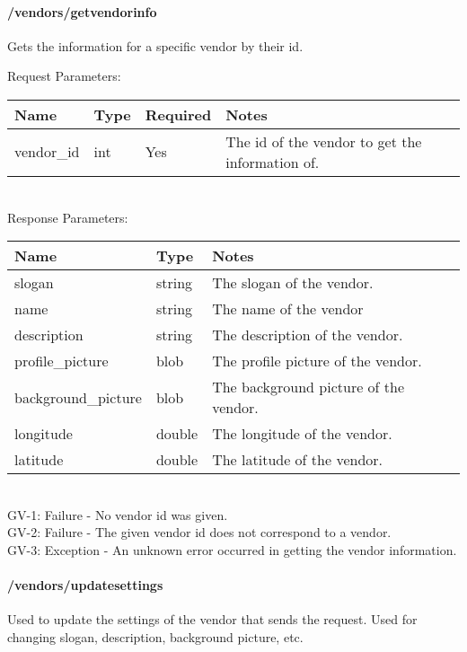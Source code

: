\documentclass{article}[11pt]
\begin{document}
\paragraph{/vendors/getvendorinfo}\textbf{}

Gets the information for a specific vendor by their id.

\noindent
Request Parameters:

\noindent
\begin{tabular}{|l|l|l|l|}
\hline
\textbf{Name} & \textbf{Type} & \textbf{Required} & \textbf{Notes} \\
\hline
vendor\_id & int & Yes & The id of the vendor to get the information of. \\
\hline
\end{tabular} \\

\noindent
Response Parameters: \\

\noindent
\begin{tabular}{|l|l|l|}
\hline
\textbf{Name} & \textbf{Type} & \textbf{Notes} \\
\hline
slogan & string & The slogan of the vendor. \\
name & string & The name of the vendor \\
description & string & The description of the vendor. \\
profile\_picture & blob & The profile picture of the vendor. \\
background\_picture & blob & The background picture of the vendor. \\
longitude & double & The longitude of the vendor. \\
latitude & double & The latitude of the vendor. \\
\hline
\end{tabular} \\

\ErrorsSession
GV-1: Failure - No vendor id was given. \\
GV-2: Failure - The given vendor id does not correspond to a vendor. \\
GV-3: Exception - An unknown error occurred in getting the vendor information. \\


\paragraph{/vendors/updatesettings}\textbf{}

Used to update the settings of the vendor that sends the request. Used for changing slogan, description, background picture, etc. \\
\end{document}
